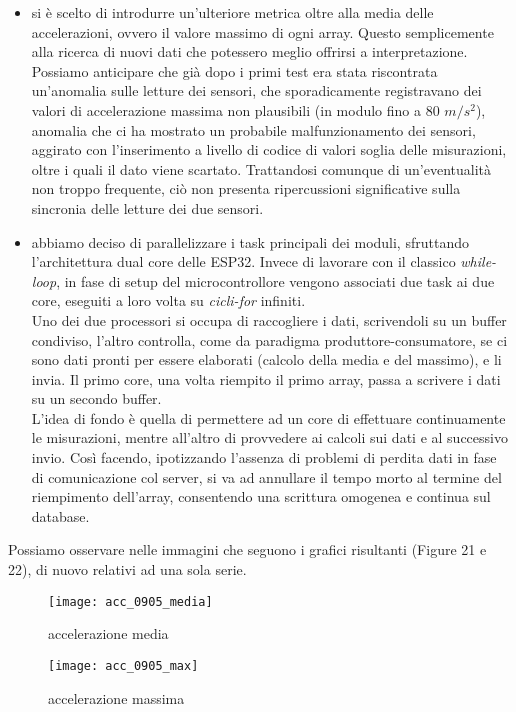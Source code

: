 \documentclass[fleqn,10pt]{SelfArx} %
\begin{document}
\begin{itemize}[noitemsep] %
	\item si è scelto di introdurre un'ulteriore metrica oltre alla media delle accelerazioni, ovvero il valore massimo di 
	ogni array. Questo semplicemente alla ricerca di nuovi dati che potessero meglio offrirsi a interpretazione.\\
	Possiamo anticipare che già dopo i primi test era stata riscontrata un'anomalia sulle letture dei sensori, che sporadicamente 
	registravano dei valori di accelerazione massima non plausibili (in modulo fino a 80 $ m/s^2 $), anomalia che ci ha mostrato 
	un probabile malfunzionamento dei sensori, aggirato con l'inserimento a livello di codice di valori soglia delle misurazioni, 
	oltre i quali il dato viene scartato. Trattandosi comunque di un'eventualità non troppo frequente, ciò non presenta 
	ripercussioni significative sulla sincronia delle letture dei due sensori.
	\item abbiamo deciso di parallelizzare i task principali dei moduli, sfruttando l'architettura dual core delle ESP32. 
	Invece di lavorare con il classico \textit{while-loop}, in fase di setup del microcontrollore vengono associati due task ai due 
	core, eseguiti a loro volta su \textit{cicli-for} infiniti. \\
	Uno dei due processori si occupa di raccogliere i dati, scrivendoli su un buffer 
	condiviso, l'altro controlla, come da paradigma produttore-consumatore, se ci sono dati pronti per essere elaborati (calcolo 
	della media e del massimo), e li invia. Il primo core, una volta riempito il primo array, passa a scrivere i dati su un 
	secondo buffer.\\
	L'idea di fondo è quella di permettere ad un core di effettuare continuamente le misurazioni, mentre all'altro di provvedere 
	ai calcoli sui dati e al successivo invio. Così facendo, ipotizzando l'assenza di problemi di perdita dati in fase di 
	comunicazione col server, si va ad annullare il tempo morto al termine del riempimento dell'array,
	consentendo una scrittura omogenea e continua sul database.
\end{itemize}

Possiamo osservare nelle immagini che seguono i grafici risultanti (Figure 21 e 22), di nuovo relativi ad una sola serie. 

\begin{figure}[htb]\centering
	\texttt{[image: acc\_0905\_media]}
	\caption{accelerazione media}
	\label{fig:zoom accelerazione 2104}
\end{figure}
\begin{figure}[htb]\centering
	\texttt{[image: acc\_0905\_max]}
	\caption{accelerazione massima}
	\label{fig:zoom accelerazione 2104}
\end{figure}
\end{document}
